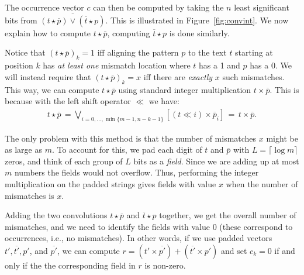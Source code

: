\documentclass[12pt]{article}
\newcommand{\rem}[1]{{\marginpar{\raggedright\scriptsize #1}}}
\begin{document}
The occurrence vector $c$ can then be computed by taking the $n$ least 
significant bits from $
\overline{{(t \star \overline{p})}\vee
  {(\overline{t}\star p)}}$. This is illustrated in Figure~\ref{fig:convint}.
We now explain how to compute $t \star \overline{p}$, computing $\overline{t}\star p$ is done similarly. 

Notice that $(t \star \overline{p})_k =1$ iff 
aligning the pattern $p$ to the text $t$ starting at position $k$ has {\em at least one}  mismatch location where $t$ has a 1 and $p$ has a 0. We will instead require that $(t \star \overline{p})_k = x$ iff there are {\em exactly} $x$  such  mismatches. This way, we can compute
$t \star \overline{p}$ using standard integer multiplication $t \times \overline{p}$. This is because with the left shift operator $\ll$ we have:
\begin{eqnarray*}
t \star \overline{p}  \,= \bigvee_{i=0,\ldots,\min\{m-1,n-k-1\} } [(t \ll i) \times
\overline{p}_i] \,=\, t \times \overline{p}.
\end{eqnarray*}

%

The only problem with this method is that the number of mismatches $x$ might be as large as $m$. To account for this, 
we pad each digit of $t$ and $\overline p$ with $L=\lceil \log m
\rceil$ zeros,
and think of each group of $L$ bits as a {\em field}. Since we are adding up
at most $m$ numbers the fields would not overflow.  Thus, performing
the integer multiplication on the padded strings gives fields with
value $x$ when the number
of mismatches is $x$.  


Adding the two convolutions $t \star \overline{p}$  and $\overline t \star {p}$ together, we get the
overall number of mismatches, and we need to identify the fields with value 0 (these correspond to occurrences, i.e., no mismatches). In other
words, if we use padded vectors $t', \overline{t'}, p'$, and 
$\overline{p'}$, we can compute $r = {(t' \times \overline{p'})} +
{(\overline{t'}\times p')}$ and set ${c}_k = 0$ if and only if the
the corresponding field in $r$ is non-zero.
\end{document}
